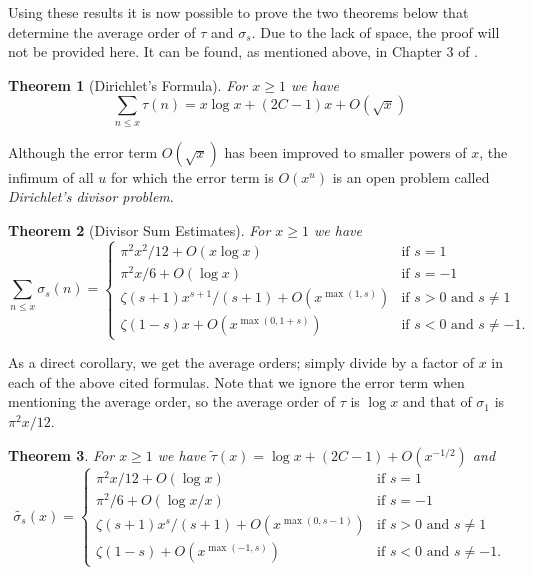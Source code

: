 \documentclass{article}
\newtheorem{theorem}{Theorem}
\theoremstyle{definition}
\begin{document}
Using these results it is now possible to prove the two theorems below that determine the average order of \(\tau\) and \(\sigma_s\).
Due to the lack of space, the proof will not be provided here.
It can be found, as mentioned above, in Chapter 3 of \cite{Apostol1976}.

\begin{theorem}[Dirichlet's Formula]\label{theorem:tau}
    For \(x\ge 1\) we have
    \[\sum_{n\le x} \tau(n) = x\log x + (2C-1)x + O(\sqrt x)\]
\end{theorem}

Although the error term \(O(\sqrt x)\) has been improved to smaller powers of \(x\), the infimum of all \(u\) for which the error term is \(O(x^u)\) is an open problem called \textit{Dirichlet's divisor problem}.

\begin{theorem}[Divisor Sum Estimates]\label{theorem:sigma}
    For \(x\ge 1\) we have
    \[
        \sum_{n\le x} \sigma_s(n) =
        \begin{cases}
            \pi^2x^2/12 + O(x\log x) & \text{if } s=1 \\
            \pi^2x/6 + O(\log x) & \text{if } s=-1 \\
            \zeta(s+1)x^{s+1}/(s+1) + O(x^{\max(1,s)}) & \text{if } s>0 \text{ and } s\ne 1 \\
            \zeta(1-s)x + O(x^{\max(0,1+s)}) & \text{if } s<0 \text{ and } s\ne -1.
        \end{cases}
    \]
\end{theorem}

As a direct corollary, we get the average orders; simply divide by a factor of \(x\) in each of the above cited formulas.
Note that we ignore the error term when mentioning the average order, so the average order of \(\tau\) is \(\log x\) and that of \(\sigma_1\) is \(\pi^2x/12\).

\begin{theorem}
    For \(x\ge 1\) we have \(\tilde{\tau}(x) = \log x + (2C-1) + O(x^{-1/2})\) and
    \[
        \tilde{\sigma_s}(x) =
        \begin{cases}
            \pi^2x/12 + O(\log x) & \text{if } s=1 \\
            \pi^2/6 + O(\log x/x) & \text{if } s=-1 \\
            \zeta(s+1)x^s/(s+1) + O(x^{\max(0,s-1)}) & \text{if } s>0 \text{ and } s\ne 1 \\
            \zeta(1-s) + O(x^{\max(-1,s)}) & \text{if } s<0 \text{ and } s\ne -1.
        \end{cases}
    \]
\end{theorem}
\end{document}
